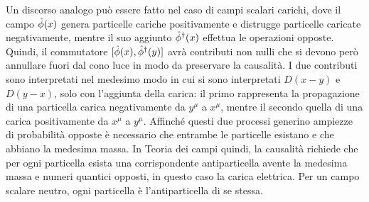 Un discorso analogo può essere fatto nel caso di campi scalari carichi, dove il campo $\hat{\phi}(x)$ genera particelle cariche positivamente e distrugge particelle caricate negativamente, mentre il suo aggiunto $\hat{\phi}^\dagger(x)$ effettua le operazioni opposte. Quindi, il commutatore $[\hat{\phi}(x),\hat{\phi}^\dagger(y)]$ avrà contributi non nulli che si devono però annullare fuori dal cono luce in modo da preservare la causalità. I due contributi sono interpretati nel medesimo modo in cui si sono interpretati $D(x - y)$ e $D(y - x)$, solo con l'aggiunta della carica: il primo rappresenta la propagazione di una particella carica negativamente da $y^\mu$ a $x^\mu$, mentre il secondo quella di una carica positivamente  da $x^\mu$ a $y^\mu$. Affinché questi due processi generino ampiezze di probabilità opposte è necessario che entrambe le particelle esistano e che abbiano la medesima massa. In Teoria dei campi quindi, la causalità richiede che per ogni particella esista una corrispondente antiparticella avente la medesima massa e numeri quantici opposti, in questo caso la carica elettrica. Per un campo scalare neutro, ogni particella è l'antiparticella di se stessa.

